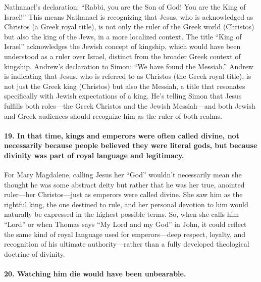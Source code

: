 Nathanael's declaration: ``Rabbi, you are the Son of God!
You are the King of Israel!'' This means Nathanael is recognizing that Jesus, who is acknowledged as Christos (a Greek royal title), is not only the ruler of the Greek world (Christos) but also the king of the Jews, in a more localized context.
The title ``King of Israel'' acknowledges the Jewish concept of kingship, which would have been understood as a ruler over Israel, distinct from the broader Greek context of kingship.
Andrew's declaration to Simon: ``We have found the Messiah.'' Andrew is indicating that Jesus, who is referred to as Christos (the Greek royal title), is not just the Greek king (Christos) but also the Messiah, a title that resonates specifically with Jewish expectations of a king.
He's telling Simon that Jesus fulfills both roles---the Greek Christos and the Jewish Messiah---and both Jewish and Greek audiences should recognize him as the ruler of both realms.

\paragraph{19.
In that time, kings and emperors were often called divine, not necessarily because people believed they were literal gods, but because divinity was part of royal language and legitimacy.}\label{par:in-that-time-kings-and-emperors-were-often-called-divine-not-necessarily-because-people-believed-they-were-literal-gods-but-because-divinity-was-part-of-royal-language-and-legitimacy.}

For Mary Magdalene, calling Jesus her ``God'' wouldn't necessarily mean she thought he was some abstract deity but rather that he was her true, anointed ruler---her Christos---just as emperors were called divine.
She saw him as the rightful king, the one destined to rule, and her personal devotion to him would naturally be expressed in the highest possible terms.
So, when she calls him ``Lord'' or when Thomas says ``My Lord and my God'' in John, it could reflect the same kind of royal language used for emperors---deep respect, loyalty, and recognition of his ultimate authority---rather than a fully developed theological doctrine of divinity.

\paragraph{20.
Watching him die would have been unbearable.}\label{par:watching-him-die-would-have-been-unbearable.}

